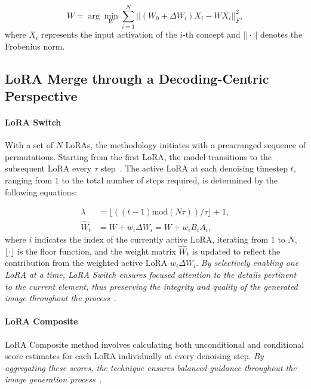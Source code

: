 \begin{equation}
    \label{lorag}
    W = \arg \min_{W}\sum_{i=1}^{N} ||(W_{0}+\Delta W_{i})X_{i}-WX_{i}||^{2}_{F},
\end{equation}
where $X_{i}$ represents the input activation of the $i$-th concept and $||\cdot||$ denotes the Frobenius norm.

\subsection{LoRA Merge through a Decoding-Centric Perspective}
\label{sec:decoding}
\paragraph{LoRA Switch}
With a set of $N$ LoRAs, the methodology initiates with a prearranged sequence of permutations. Starting from the first LoRA, the model transitions to the subsequent LoRA every $\tau$ step~\citep{multilora}. The active LoRA at each denoising timestep $t$, ranging from $1$ to the total number of steps required, is determined by the following equations:

\begin{equation}
\begin{aligned}
    \label{loraswitch}
    \lambda &= \lfloor((t-1)\text{mod}(N\tau))/\tau\rfloor+1,\\
    \hat{W}_{t} &= W + w_{i}\Delta W_{i}=W+w_{i}B_{i}A_{i},
\end{aligned}
\end{equation}
where $i$ indicates the index of the currently active LoRA, iterating from $1$ to $N$, $\lfloor\cdot\rfloor$ is the floor function, and the weight matrix $\hat{W}_{t}$ is updated to reflect the contribution from the weighted active LoRA $w_{i}\Delta W_{i}$. \textit{By selectively enabling one LoRA at a time, LoRA Switch ensures focused attention to the details pertinent to the current element, thus preserving the integrity and quality of the generated image throughout the process}~\citep{multilora}.

\paragraph{LoRA Composite}
LoRA Composite method involves calculating both unconditional and conditional score estimates for each LoRA individually at every denoising step. \textit{By aggregating these scores, the technique ensures balanced guidance throughout the image generation process}~\citep{multilora}.

